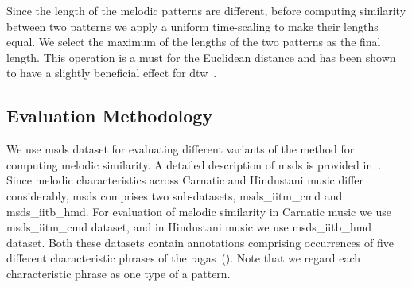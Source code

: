 %

Since the length of the melodic patterns are different, before computing similarity between two patterns we apply  a uniform time-scaling to make their lengths equal. We select the maximum of the lengths of the two patterns as the final length. This operation is a must for the Euclidean distance and has been shown to have a slightly beneficial effect for \gls{dtw}~\citep{Ratanamahatana2004,zhu2003query}.


\subsection{Evaluation Methodology}
\label{sec:patterns_melodic_similarity_evaluation_methodology}

We use \acrshort{msds} dataset for evaluating different variants of the method for computing melodic similarity. A detailed description of \acrshort{msds} is provided in~. Since melodic characteristics across Carnatic and Hindustani music differ considerably, \acrshort{msds} comprises two sub-datasets, \acrshort{msds_iitm_cmd} and \acrshort{msds_iitb_hmd}. For evaluation of melodic similarity in Carnatic music we use \acrshort{msds_iitm_cmd} dataset, and in Hindustani music we use \acrshort{msds_iitb_hmd} dataset. Both these datasets contain annotations comprising occurrences of five different characteristic phrases of the \glspl{raga}~(). Note that we regard each characteristic phrase as one type of a pattern.

